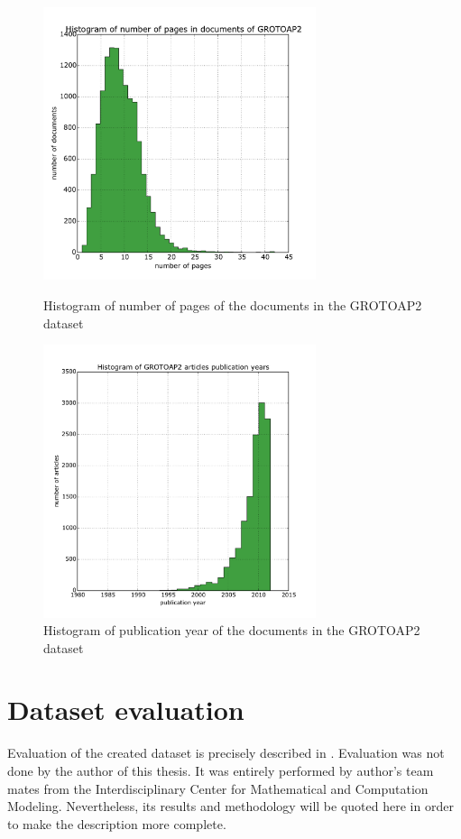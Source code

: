 \begin{figure}
  \centering
\begin{minipage}[t!]{0.45\linewidth}
  \includegraphics[width=8cm]{plots/pages_histogram}
  \caption{Histogram of number of pages of the documents in the GROTOAP2 dataset}
  \label{fig:page_count_histogram}
\end{minipage}
\quad
\begin{minipage}[t!]{0.45\linewidth}
  \includegraphics[width=8cm]{plots/publication_year_histogram}
  \caption{Histogram of publication year of the documents in the GROTOAP2 dataset}
  \label{fig:publication_year_histogram}
\end{minipage}
\end{figure}

\section{Dataset evaluation}
Evaluation of the created dataset is precisely described in \cite{DominikaTkaczykPaweSzostek2014}. Evaluation was not done by the author of this thesis. It was entirely performed by author's team mates from the Interdisciplinary Center for Mathematical and Computation Modeling. Nevertheless, its results and methodology will be quoted here in order to make the description more complete.

